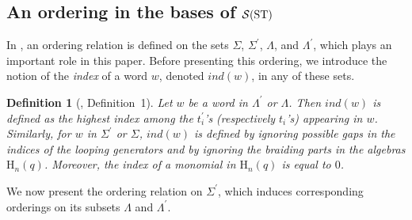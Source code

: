 \documentclass[11pt]{amsart}
\newtheorem{defn}{Definition}
\begin{document}
\subsection{An ordering in the bases of \(\mathcal{S}({\rm ST})\)}

In \cite{DL2}, an ordering relation is defined on the sets \(\Sigma\), \(\Sigma^{\prime}\), \(\Lambda\), and \(\Lambda^{\prime}\), which plays an important role in this paper. Before presenting this ordering, we introduce the notion of the \textit{index} of a word \(w\), denoted \(ind(w)\), in any of these sets.

\begin{defn}[\cite{DL2}, Definition~1] \rm 
Let \(w\) be a word in \(\Lambda^{\prime}\) or \(\Lambda\). Then \(ind(w)\) is defined as the highest index among the \(t_i^{\prime}\)'s (respectively \(t_i\)'s) appearing in \(w\). Similarly, for \(w\) in \(\Sigma^{\prime}\) or \(\Sigma\), \(ind(w)\) is defined by ignoring possible gaps in the indices of the looping generators and by ignoring the braiding parts in the algebras \(\mathrm{H}_n(q)\). Moreover, the index of a monomial in \(\mathrm{H}_n(q)\) is equal to \(0\).
\end{defn}

We now present the ordering relation on \(\Sigma^{\prime}\), which induces corresponding orderings on its subsets \(\Lambda\) and \(\Lambda^{\prime}\).
\end{document}
